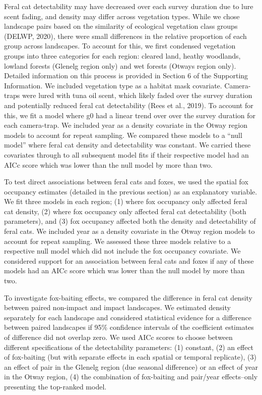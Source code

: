 \documentclass[]{elsarticle} %
\begin{document}
Feral cat detectability may have decreased over each survey duration due to lure scent fading, and density may differ across vegetation types. While we chose landscape pairs based on the similarity of ecological vegetation class groups (DELWP, 2020), there were small differences in the relative proportion of each group across landscapes. To account for this, we first condensed vegetation groups into three categories for each region: cleared land, heathy woodlands, lowland forests (Glenelg region only) and wet forests (Otways region only). Detailed information on this process is provided in Section 6 of the Supporting Information. We included vegetation type as a habitat mask covariate. Camera-traps were lured with tuna oil scent, which likely faded over the survey duration and potentially reduced feral cat detectability (Rees et al., 2019). To account for this, we fit a model where g0 had a linear trend over over the survey duration for each camera-trap. We included year as a density covariate in the Otway region models to account for repeat sampling. We compared these models to a ``null model'' where feral cat density and detectability was constant. We carried these covariates through to all subsequent model fits if their respective model had an AICc score which was lower than the null model by more than two.

To test direct associations between feral cats and foxes, we used the spatial fox occupancy estimates (detailed in the previous section) as an explanatory variable. We fit three models in each region; (1) where fox occupancy only affected feral cat density, (2) where fox occupancy only affected feral cat detectability (both parameters), and (3) fox occupancy affected both the density and detectability of feral cats. We included year as a density covariate in the Otway region models to account for repeat sampling. We assessed these three models relative to a respective null model which did not include the fox occupancy covariate. We considered support for an association between feral cats and foxes if any of these models had an AICc score which was lower than the null model by more than two.

To investigate fox-baiting effects, we compared the difference in feral cat density between paired non-impact and impact landscapes. We estimated density separately for each landscape and considered statistical evidence for a difference between paired landscapes if 95\% confidence intervals of the coefficient estimates of difference did not overlap zero. We used AICc scores to choose between different specifications of the detectability parameters: (1) constant, (2) an effect of fox-baiting (but with separate effects in each spatial or temporal replicate), (3) an effect of pair in the Glenelg region (due seasonal difference) or an effect of year in the Otway region, (4) the combination of fox-baiting and pair/year effects--only presenting the top-ranked model.
\end{document}
